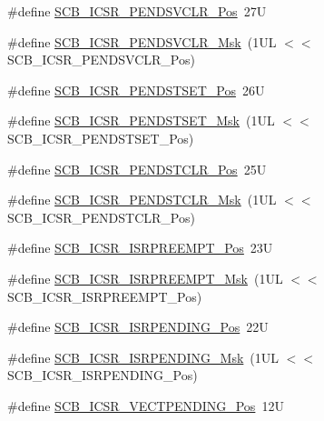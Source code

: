 \begin{DoxyCompactItemize}
\#define \mbox{\hyperlink{group___c_m_s_i_s___s_c_b_gae218d9022288f89faf57187c4d542ecd}{S\+C\+B\+\_\+\+I\+C\+S\+R\+\_\+\+P\+E\+N\+D\+S\+V\+C\+L\+R\+\_\+\+Pos}}~27U
\item 
\#define \mbox{\hyperlink{group___c_m_s_i_s___s_c_b_ga4a901ace381d3c1c74ac82b22fae2e1e}{S\+C\+B\+\_\+\+I\+C\+S\+R\+\_\+\+P\+E\+N\+D\+S\+V\+C\+L\+R\+\_\+\+Msk}}~(1\+U\+L $<$$<$ S\+C\+B\+\_\+\+I\+C\+S\+R\+\_\+\+P\+E\+N\+D\+S\+V\+C\+L\+R\+\_\+\+Pos)
\item 
\#define \mbox{\hyperlink{group___c_m_s_i_s___s_c_b_ga9dbb3358c6167c9c3f85661b90fb2794}{S\+C\+B\+\_\+\+I\+C\+S\+R\+\_\+\+P\+E\+N\+D\+S\+T\+S\+E\+T\+\_\+\+Pos}}~26U
\item 
\#define \mbox{\hyperlink{group___c_m_s_i_s___s_c_b_ga7325b61ea0ec323ef2d5c893b112e546}{S\+C\+B\+\_\+\+I\+C\+S\+R\+\_\+\+P\+E\+N\+D\+S\+T\+S\+E\+T\+\_\+\+Msk}}~(1\+U\+L $<$$<$ S\+C\+B\+\_\+\+I\+C\+S\+R\+\_\+\+P\+E\+N\+D\+S\+T\+S\+E\+T\+\_\+\+Pos)
\item 
\#define \mbox{\hyperlink{group___c_m_s_i_s___s_c_b_gadbe25e4b333ece1341beb1a740168fdc}{S\+C\+B\+\_\+\+I\+C\+S\+R\+\_\+\+P\+E\+N\+D\+S\+T\+C\+L\+R\+\_\+\+Pos}}~25U
\item 
\#define \mbox{\hyperlink{group___c_m_s_i_s___s_c_b_gab241827d2a793269d8cd99b9b28c2157}{S\+C\+B\+\_\+\+I\+C\+S\+R\+\_\+\+P\+E\+N\+D\+S\+T\+C\+L\+R\+\_\+\+Msk}}~(1\+U\+L $<$$<$ S\+C\+B\+\_\+\+I\+C\+S\+R\+\_\+\+P\+E\+N\+D\+S\+T\+C\+L\+R\+\_\+\+Pos)
\item 
\#define \mbox{\hyperlink{group___c_m_s_i_s___s_c_b_ga11cb5b1f9ce167b81f31787a77e575df}{S\+C\+B\+\_\+\+I\+C\+S\+R\+\_\+\+I\+S\+R\+P\+R\+E\+E\+M\+P\+T\+\_\+\+Pos}}~23U
\item 
\#define \mbox{\hyperlink{group___c_m_s_i_s___s_c_b_gaa966600396290808d596fe96e92ca2b5}{S\+C\+B\+\_\+\+I\+C\+S\+R\+\_\+\+I\+S\+R\+P\+R\+E\+E\+M\+P\+T\+\_\+\+Msk}}~(1\+U\+L $<$$<$ S\+C\+B\+\_\+\+I\+C\+S\+R\+\_\+\+I\+S\+R\+P\+R\+E\+E\+M\+P\+T\+\_\+\+Pos)
\item 
\#define \mbox{\hyperlink{group___c_m_s_i_s___s_c_b_ga10749d92b9b744094b845c2eb46d4319}{S\+C\+B\+\_\+\+I\+C\+S\+R\+\_\+\+I\+S\+R\+P\+E\+N\+D\+I\+N\+G\+\_\+\+Pos}}~22U
\item 
\#define \mbox{\hyperlink{group___c_m_s_i_s___s_c_b_ga056d74fd538e5d36d3be1f28d399c877}{S\+C\+B\+\_\+\+I\+C\+S\+R\+\_\+\+I\+S\+R\+P\+E\+N\+D\+I\+N\+G\+\_\+\+Msk}}~(1\+U\+L $<$$<$ S\+C\+B\+\_\+\+I\+C\+S\+R\+\_\+\+I\+S\+R\+P\+E\+N\+D\+I\+N\+G\+\_\+\+Pos)
\item 
\#define \mbox{\hyperlink{group___c_m_s_i_s___s_c_b_gada60c92bf88d6fd21a8f49efa4a127b8}{S\+C\+B\+\_\+\+I\+C\+S\+R\+\_\+\+V\+E\+C\+T\+P\+E\+N\+D\+I\+N\+G\+\_\+\+Pos}}~12U
$$
\end{DoxyCompactItemize}
